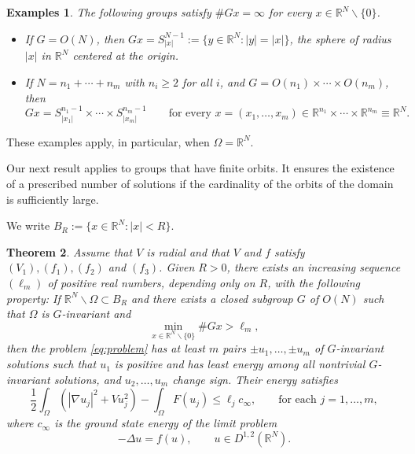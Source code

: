 \documentclass[10pt,letterpaper]{article}
\newtheorem{theorem}{Theorem}[section]
\newtheorem{examples}[theorem]{Examples}
\numberwithin{equation}{section}
\def\r{\mathbb{R}}
\def\rn{\mathbb{R}^N}
\def\io{\int_{\Omega}}
\def\o{\Omega}
\begin{document}
\begin{examples}
The following groups satisfy $\#Gx = \infty$ for every $x\in\rn\smallsetminus\{0\}$.
\begin{itemize}
\item[$(a)$] If $G=O(N)$, then $Gx= S_{|x|}^{N-1}:=\{y\in\rn:|y|=|x|\}$, the sphere of radius $|x|$ in $\rn$ centered at the origin.
\item[$(b)$] If $N=n_1+\cdots+n_m$ with $n_i\geq 2$ for all $i$, and $G=O(n_1)\times\cdots\times O(n_m)$, then 
$$Gx= S^{n_1-1}_{|x_1|}\times\cdots\times S^{n_m-1}_{|x_m|}\qquad\text{for every \ }x=(x_1,\ldots,x_m)\in\r^{n_1}\times\cdots\times\r^{n_m}\equiv\rn.$$
\end{itemize}
\end{examples}

These examples apply, in particular, when $\o=\rn$.

Our next result applies to groups that have finite orbits. It ensures the existence of a prescribed number of solutions if the cardinality of the orbits of the domain is sufficiently large. 

We write $B_R:=\{x\in\rn:|x|<R\}$.

\begin{theorem} \label{thm:main2}
Assume that $V$ is radial and that $V$ and $f$ satisfy $(V_1),(f_1), (f_2)$ and $(f_3)$. Given $R>0$, there exists an increasing sequence $(\ell_m)$ of positive real numbers, depending only on $R$, with the following property: If $\rn \smallsetminus\o\subset B_R$ and there exists a closed subgroup $G$ of $O(N)$ such that $\o$ is $G$-invariant and
$$\min_{x\in\rn\smallsetminus\{0\}}\# Gx > \ell_m,$$
then the problem \eqref{eq:problem} has at least $m$ pairs $\pm u_1,\ldots,\pm u_m$ of $G$-invariant solutions such that $u_1$ is positive and has least energy among all nontrivial $G$-invariant solutions, and $u_2,\ldots,u_m$ change sign. Their energy satisfies
$$\frac{1}{2}\io (|\nabla u_j|^2+Vu_j^2)-\io F(u_j)\leq\ell_jc_\infty,\qquad\text{for each \ }j=1,\ldots,m,$$
where $c_\infty$ is the ground state energy of the limit problem 
\begin{equation}
\label{eq:limit problem}
-\Delta u = f(u), \qquad u\in D^{1,2}(\rn).
\end{equation}
\end{theorem}
\end{document}
